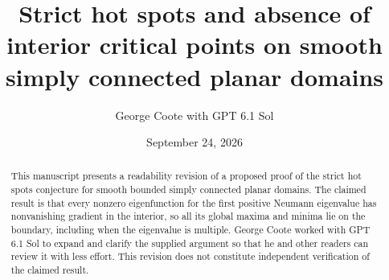 \documentclass[11pt]{article}
\title{Strict hot spots and absence of interior critical points on smooth
simply connected planar domains}
\author{George Coote with GPT 6.1 Sol}
\date{September 24, 2026}
\theoremstyle{definition}
\numberwithin{equation}{section}
\begin{document}
\maketitle
\begin{abstract}
This manuscript presents a readability revision of a proposed proof of
the strict hot spots conjecture for smooth bounded simply connected planar
domains. The claimed result is that every nonzero eigenfunction for the
first positive Neumann eigenvalue has nonvanishing gradient in the
interior, so all its global maxima and minima lie on the boundary,
including when the eigenvalue is multiple. George Coote worked with
GPT 6.1 Sol to expand and clarify the supplied argument so that he and
other readers can review it with less effort. This revision does not
constitute independent verification of the claimed result.
\end{abstract}








\end{document}
